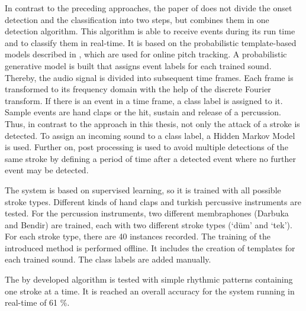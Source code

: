 In contrast to the preceding approaches, the paper of \autocite{Simsekli:2011} does not divide the onset detection and the classification into two steps, but combines them in one detection algorithm. This algorithm is able to receive events during its run time and to classify them in real-time. It is based on the probabilistic template-based models described in \autocite{Simsekli:2010}, which are used for online pitch tracking. A probabilistic generative model is built that assigns event labels for each trained sound. Thereby, the audio signal is divided into subsequent time frames. Each frame is transformed to its frequency domain with the help of the discrete Fourier transform. If there is an event in a time frame, a class label is assigned to it. Sample events are hand claps or the hit, sustain and release of a percussion. Thus, in contrast to the approach in this thesis, not only the attack of a stroke is detected. To assign an incoming sound to a class label, a Hidden Markov Model is used. Further on, post processing is used to avoid multiple detections of the same stroke by defining a period of time after a detected event where no further event may be detected.

The system is based on supervised learning, so it is trained with all possible stroke types. Different kinds of hand claps and turkish percussive instruments are tested. For the percussion instruments, two different membraphones (Darbuka and Bendir) are trained, each with two different stroke types (`düm' and `tek'). For each stroke type, there are 40 instances recorded. The training of the introduced method is performed offline. It includes the creation of templates for each trained sound. The class labels are added manually. 

The by \autocite{Simsekli:2011} developed algorithm is tested with simple rhythmic patterns containing one stroke at a time. It is reached an overall accuracy for the system running in real-time of 61 \%.

 




